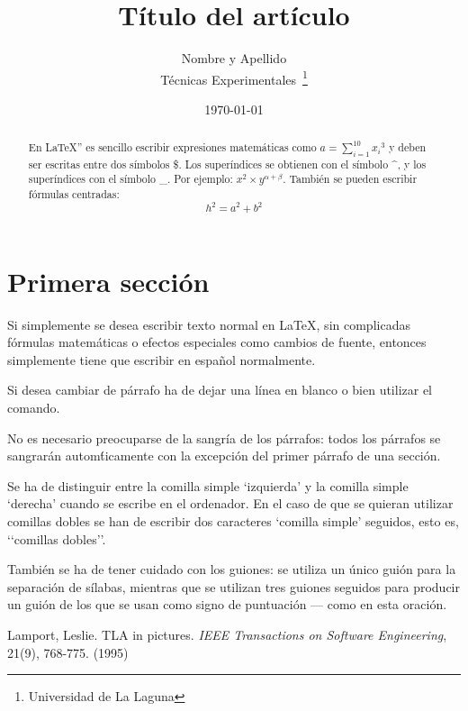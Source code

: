 \documentclass[a4paper,12pt]{article}
\begin{document}
 
\title{Título del artículo}
\author{Nombre y Apellido \\ 
        T\'ecnicas Experimentales~\footnote{Universidad de La Laguna}
        }
\date{\today}
\maketitle
\begin{abstract}
 En \LaTeX{}''\cite{Lam:86} es sencillo escribir expresiones
 matem\'aticas como $a=\sum_{i=1}^{10} {x_i}^{3}$
 y deben ser escritas entre dos s\'imbolos \$.
 Los superíndices se obtienen con el s\'imbolo \^{}, y
 los super\'indices con el s\'imbolo \_.
 Por ejemplo: $x^2 \times y ^{\alpha + \beta}$.
 Tambi\'en se pueden escribir f\'ormulas centradas:
 \[h^2=a^2 + b^2 \]
\end{abstract}

\section{Primera sección}
Si simplemente se desea escribir texto normal en LaTeX,
sin complicadas f\'ormulas matem\'aticas o efectos especiales
como cambios de fuente, entonces simplemente tiene que escribir
en espa\~nol normalmente.

Si desea cambiar de p\'arrafo ha de dejar una l\'inea en blanco o bien
utilizar el comando.\par

No es necesario preocuparse de la sangr\'ia de los p\'arrafos:
todos los p\'arrafos se sangrarán autom\'ticamente con la excepci\'on
del primer párrafo de una secci\'on.

Se ha de distinguir entre la comilla simple ‘izquierda’
y la comilla simple ‘derecha’ cuando se escribe en el ordenador.
En el caso de que se quieran utilizar comillas dobles se han de
escribir dos caracteres ‘comilla simple’ seguidos, esto es,
‘‘comillas dobles’’.\par

Tambi\'en se ha de tener cuidado con los guiones: se utiliza un \'unico
gui\'on para la separación de s\'ilabas, mientras que se utilizan
tres guiones seguidos para producir un guión de los que se usan
como signo de puntuaci\'on --- como en esta oración.

\begin{thebibliography}{00}
 Lamport, Leslie.
 TLA in pictures.
 \emph{IEEE Transactions on Software Engineering},
 21(9), 768-775.
 (1995)
\end{thebibliography}
\end{document}
